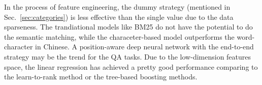\documentclass{llncs}
\begin{document}
In the process of feature engineering, the dummy  strategy (mentioned in Sec.~\ref{sec:categories}) is less effective than the single value due to the data sparseness. The trandiational models like BM25 do not have the potential to do the semantic matching, while the characeter-based model outperforms the word-character in Chinese. A position-aware deep neural network with the end-to-end strategy may be the trend for the QA tasks. Due to the low-dimension features space, the linear regression has achieved a pretty good performance comparing to the learn-to-rank method or the tree-based boosting methods.
\end{document}
